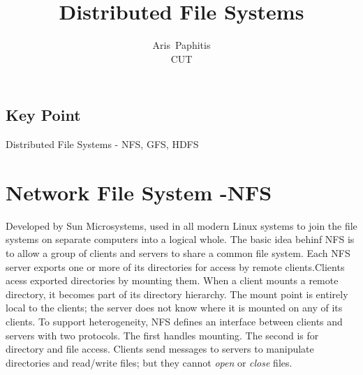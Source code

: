 \documentclass[letterpaper,twocolumn,10pt]{article}
\begin{document}
\date{}

\title{\Large \bf Distributed File Systems}

\author{
{\rm Aris\ Paphitis}\\
CUT
} %

\maketitle

\thispagestyle{empty}


\subsection*{Key Point}
Distributed File Systems - NFS, GFS, HDFS

\section{Network File System -NFS}
Developed by Sun Microsystems, used in all modern Linux systems to join the file systems on separate computers into a logical whole.
The basic idea behinf NFS is to allow a group of clients and servers to share a common file system.
Each NFS server exports one or more of its directories for access by remote clients.Clients acess exported directories by mounting them. When a client mounts a remote directory, it becomes part of its directory hierarchy. The mount point is entirely local to the clients; the server does not know where it is mounted on any of its clients.
To support heterogeneity, NFS defines an interface between clients and servers with two protocols. The first handles mounting. The second is for directory and file access. Clients send messages to servers to manipulate directories and read/write files; but they cannot \textit{open} or \textit{close} files.



{\footnotesize 
}


\theendnotes
\end{document}
